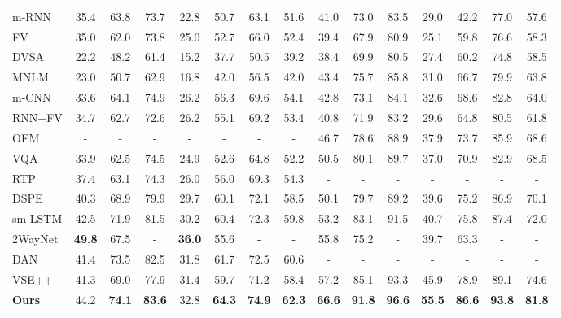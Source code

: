 \documentclass[10pt,twocolumn,letterpaper]{article}
\begin{document}
\begin{table*}[t]
\begin{tabular}{l|ccc|ccc|c|ccc|ccc|c}
m-RNN \cite{mao2014explain}                &35.4 &63.8 &73.7  &22.8 &50.7 &63.1 & 51.6   &41.0 &73.0 &83.5 &29.0 &42.2 &77.0  & 57.6\\
FV \cite{klein2015associating}             &35.0 &62.0 &73.8 &25.0 &52.7 &66.0  & 52.4   &39.4 &67.9 &80.9 &25.1 &59.8 &76.6  & 58.3\\
DVSA \cite{karpathy2014vsa}                &22.2 &48.2 &61.4  &15.2 &37.7 &50.5 & 39.2   &38.4 &69.9 &80.5 &27.4 &60.2 &74.8  & 58.5\\
MNLM \cite{kiros2014unifying}              &23.0 &50.7 &62.9  &16.8 &42.0 &56.5  &42.0   &43.4 &75.7 &85.8 &31.0 &66.7 &79.9  & 63.8\\
m-CNN \cite{ma2015multimodal}              &33.6 &{64.1} &{74.9}  &{26.2} &{56.3} &{69.6} & 54.1   &42.8 &73.1 &84.1 &32.6 &{68.6} &{82.8} & 64.0\\
RNN+FV \cite{lev2015rnn}                   &34.7 &62.7 &72.6  &{26.2} &55.1 &69.2   & 53.4   &40.8 &71.9 &83.2 &29.6 &64.8 &80.5 & 61.8\\
OEM \cite{vendrov2015order}                &-  &-  &-  &-  &-  &-  &-  &46.7 &78.6 &88.9 &37.9 &73.7 &85.9 &68.6\\
VQA \cite{lin2016leveraging}               &33.9 &62.5  &74.5  &24.9 &52.6 &64.8 & 52.2   &50.5 &80.1 &89.7 &37.0 &70.9 &82.9 & 68.5\\
RTP  \cite{plummer2015flickr30k}           &{37.4} &63.1 &74.3 &26.0 &{56.0} &{69.3} & 54.3    &-  &-  &-  &-  &-  &-  &-  \\
DSPE \cite{wang2015learning}               &40.3 &68.9 &79.9   &29.7 &60.1 &72.1 & 58.5   &50.1 &79.7 &89.2 &39.6 &75.2 &86.9 & 70.1\\
sm-LSTM \cite{huang2016instance}           &{42.5} &{71.9} &{81.5} &{30.2} &{60.4} &{72.3}&{59.8}   &{53.2} &{83.1} &{91.5} &{40.7} &{75.8} &{87.4} & {72.0}\\
2WayNet \cite{Eisenschtat_2017_CVPR}       &\bf{49.8} &67.5 &-   &\bf{36.0} &55.6 &-  & -   &55.8 &75.2 &-  &39.7 &63.3 &- & -\\
DAN \cite{nam2016dual}                     &41.4 &73.5 &82.5  &31.8 &61.7 &72.5   & 60.6   &-  &-  &-  &-  &-  &-  &-  \\
VSE++  \cite{faghri2017vse++}              &41.3 &69.0  &77.9    &31.4 &59.7 &71.2  & 58.4  &57.2 &85.1  &93.3   &45.9 &78.9 &89.1 & 74.6\\
\textbf{Ours}                   &44.2 &\bf{74.1} &\bf{83.6}  &32.8&\bf{64.3} &\bf{74.9} &\bf{62.3}   &\bf{66.6} &\bf{91.8} &\bf{96.6} &\bf{55.5} &\bf{86.6} &\bf{93.8} &\bf{81.8}\\



\end{tabular}
\end{table*}
\end{document}
